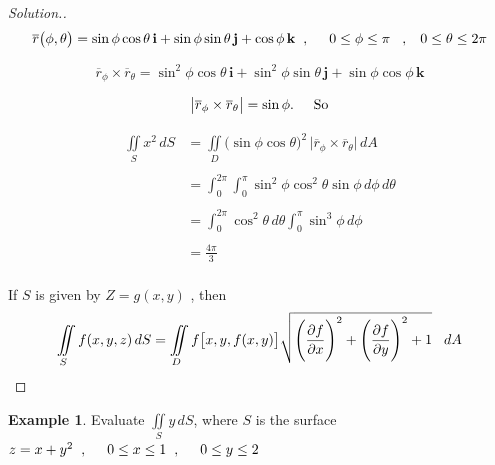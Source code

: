 \documentclass[11pt,a4paper]{article}
\theoremstyle{definition}
\newtheorem{exa}[thm]{Example}
\newenvironment{solution}
  {\renewcommand{\qedsymbol}{}\begin{proof}[\textit{Solution}.]}
  {\end{proof}}
\begin{document}
\begin{solution}
$$\overline{r}\big(\phi,\theta\big) = \sin\phi \cos \theta\, \textbf{i} + \sin\phi \sin \theta\, \textbf{j} + \cos \phi\, \textbf{k}\hspace{0.2cm},\hspace{0.5cm} 0\leq \phi \leq \pi\hspace{0.3cm},\hspace{0.3cm} 0 \leq \theta \leq 2\pi $$

$$\overline{r}_{\phi} \times \overline{r}_{\theta} = \sin^2\phi \cos \theta\, \textbf{i} + \sin^2\phi \sin \theta \,\textbf{j} + \sin \phi \cos \phi \,\textbf{k}$$

$$\big| \overline{r}_{\phi} \times \overline{r}_{\theta}\big| = \sin \phi.\hspace{0.5cm} \text{So}$$

\begin{align*}
\iint\limits_S x^2\,dS & = \iint\limits_D \big(\sin \phi \cos \theta\big)^2\, \big| \overline{r}_{\phi} \times \overline{r}_{\theta}\big|\,dA\\\\
 & = \int^{2\pi}_0\int^{\pi}_0 \sin^2\phi \cos^2\theta \sin \phi\,
d\phi\, d\theta\\\\
& = \int^{2\pi}_0\cos^2\theta \,d\theta \int^{\pi}_0\sin^3\phi \,d\phi\\\\
& = \frac{4\pi}{3}\\
\end{align*}

If $S$ is given by $Z=g(x,y)$ , then 
$$\iint\limits_S f(x,y,z)\,dS = \iint\limits_D f\big[x,y,f(x,y)\big]\sqrt{ \Bigg(\dfrac{\partial f}{\partial x}\Bigg)^2 + \Bigg(\dfrac{\partial f}{\partial y}\Bigg)^2 + 1}\hspace{0.3cm} dA$$
\end{solution}


\begin{exa}


Evaluate $\displaystyle{\iint\limits_S y\,dS}$,\hspace{0.2cm} where $S$ is the surface \hspace{0.2cm} $z = x + y^2\hspace{0.2cm},\hspace{0.5cm} 0\leq x\leq 1\hspace{0.2cm} , \hspace{0.5cm} 0 \leq y \leq 2$
\end{exa}
\end{document}
